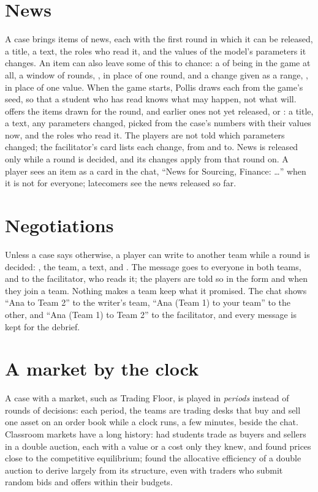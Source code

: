 \section{News}\label{sec:news}
A case brings items of news, each with the first round in which it can be released, a title, a text, the roles who
read it, and the values of the model's parameters it changes. An item can also leave some of this to chance: a
 of being in the game at all, a window of rounds, , in place of one round, and
a change given as a range, \file{[-0.4, -0.2]}, in place of one value. When the game starts, Pollis draws each
from the game's seed, so that a student who has read  knows what may happen, not what will.
 offers the items drawn for the round, and earlier ones not yet released, or : a title, a text, any parameters changed, picked
from the case's numbers with their values now, and the roles who read it. The players are not told which
parameters changed; the facilitator's card lists each change, from and to. News is released only while a round is
decided, and its changes apply from that round on. A player sees an item as a card in the chat,
``News for Sourcing, Finance: \dots'' when it is not for everyone; latecomers see the news released so far.

\section{Negotiations}\label{sec:negotiations}
Unless a case says otherwise, a player can write to another team while a round is decided: , the team,
a text, and . The message goes to everyone in both teams, and to the facilitator, who reads it;
the players are told so in the form and when they join a team. Nothing makes a team keep what it promised. The chat
shows ``Ana to Team 2'' to the writer's team, ``Ana (Team 1) to your team'' to the other, and ``Ana (Team 1) to
Team 2'' to the facilitator, and every message is kept for the debrief.

\section{A market by the clock}\label{sec:market}
A case with a market, such as Trading Floor, is played in \emph{periods} instead of rounds of decisions: each period,
the teams are trading desks that buy and sell one asset on an order book while a clock runs, a few minutes, beside
the chat. Classroom markets have a long history:  had students trade as buyers and
sellers in a double auction, each with a value or a cost only they knew, and found prices close to the competitive
equilibrium;  found the allocative efficiency of a double auction to derive
largely from its structure, even with traders who submit random bids and offers within their budgets.

